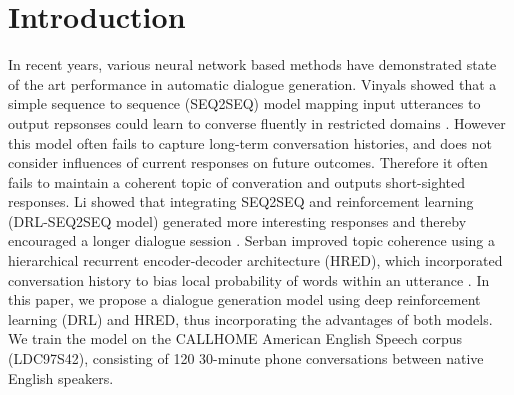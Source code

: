 \section{Introduction}
In recent years, various neural network based methods have demonstrated state of the art performance in automatic dialogue generation. Vinyals showed that a simple sequence to sequence (SEQ2SEQ) model mapping input utterances to output repsonses could learn to converse fluently in restricted domains \cite{Vinyals:15}. However this model often fails to capture long-term conversation histories, and does not consider influences of current responses on future outcomes. Therefore it often fails to maintain a coherent topic of converation and outputs short-sighted responses. Li showed that integrating SEQ2SEQ and reinforcement learning (DRL-SEQ2SEQ model) generated more interesting responses and thereby encouraged a longer dialogue session \cite{Li}. Serban improved topic coherence using a hierarchical recurrent encoder-decoder architecture (HRED), which incorporated conversation history to bias local probability of words within an utterance \cite{Serban:15}. In this paper, we propose a dialogue generation model using deep reinforcement learning (DRL) and HRED, thus incorporating the advantages of both models. We train the model on the CALLHOME American English Speech corpus (LDC97S42), consisting of 120 30-minute phone conversations between native English speakers.